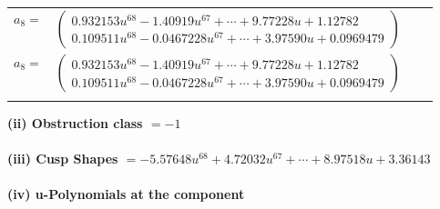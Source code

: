 \documentclass[1p]{elsarticle_modified}
\theoremstyle{definition}
\begin{document}
\begin{tabular}{m{7pt} m{180pt} m{7pt} m{180pt} }
\flushright $a_{8}=$&$\begin{pmatrix}0.932153 u^{68}-1.40919 u^{67}+\cdots+9.77228 u+1.12782\\0.109511 u^{68}-0.0467228 u^{67}+\cdots+3.97590 u+0.0969479\end{pmatrix}$\\ \flushright $a_{8}=$&$\begin{pmatrix}0.932153 u^{68}-1.40919 u^{67}+\cdots+9.77228 u+1.12782\\0.109511 u^{68}-0.0467228 u^{67}+\cdots+3.97590 u+0.0969479\end{pmatrix}$\\&\end{tabular}
\flushleft \textbf{(ii) Obstruction class $= -1$}\\~\\
\flushleft \textbf{(iii) Cusp Shapes $= -5.57648 u^{68}+4.72032 u^{67}+\cdots+8.97518 u+3.36143$}\\~\\
\newpage\renewcommand{\arraystretch}{1}
\flushleft \textbf{(iv) u-Polynomials at the component}\newline \\
\end{document}
